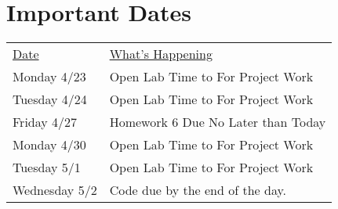 \documentclass[nobib]{tufte-handout}
\begin{document}
\section*{Important Dates}

\begin{tabular}{ll}
\underline{Date} & \underline{What's Happening} \\
 Monday 4/23 & Open Lab Time to For Project Work \\
 Tuesday 4/24 & Open Lab Time to For Project Work \\
 Friday 4/27 & Homework 6 Due No Later than Today\\
 Monday 4/30 & Open Lab Time to For Project Work \\
 Tuesday 5/1 & Open Lab Time to For Project Work \\
 Wednesday 5/2 & Code due by the end of the day.
\end{tabular}
\end{document}
